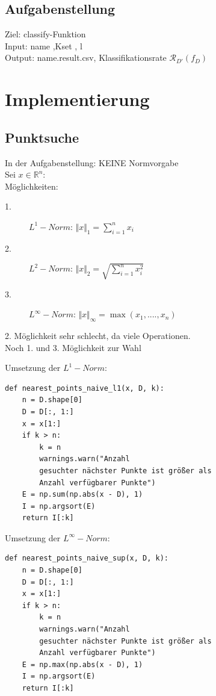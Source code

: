 \documentclass{beamer}
\begin{document}
\subsection{Aufgabenstellung}
\begin{frame}
Ziel: classify-Funktion\\
Input: name ,Kset , l \\
Output: name.result.csv, Klassifikationsrate $\mathcal{R}_{D'}(f_{D})$ \\
\vspace{20 mm}
\end{frame}



\section{Implementierung}
\subsection{Punktsuche}
\begin{frame}
In der Aufgabenstellung: KEINE Normvorgabe\\
Sei $ x \in \mathbb{R} ^n:$\\
Möglichkeiten:
\begin{description}
\item[1.] $L^1-Norm$: $\Vert x\Vert _{1}= \sum_{i=1}^n x_i $
\item[2.] $L^2-Norm$:  $\Vert x\Vert _{2}=\sqrt{ \sum_{i=1}^n x_i ^2} $
\item[3.] $L^{\infty}-Norm$:  $\Vert x\Vert _{\infty}= \max(x_1,....,x_n)$
\end{description}
2. Möglichkeit sehr schlecht, da viele Operationen.\\
Noch 1. und 3. Möglichkeit zur Wahl
\end{frame}


\begin{frame}[fragile]
Umsetzung der $L^1-Norm$:
\begin{verbatim}
def nearest_points_naive_l1(x, D, k):
    n = D.shape[0]
    D = D[:, 1:]
    x = x[1:]
    if k > n:
        k = n  
        warnings.warn("Anzahl
        gesuchter nächster Punkte ist größer als
        Anzahl verfügbarer Punkte")
    E = np.sum(np.abs(x - D), 1)
    I = np.argsort(E)
    return I[:k]
\end{verbatim}
\end{frame}


\begin{frame}[fragile]
Umsetzung der $L^{\infty}-Norm$:
\begin{verbatim}
def nearest_points_naive_sup(x, D, k):
    n = D.shape[0]
    D = D[:, 1:]
    x = x[1:]
    if k > n:
        k = n 
        warnings.warn("Anzahl
        gesuchter nächster Punkte ist größer als 
        Anzahl verfügbarer Punkte")
    E = np.max(np.abs(x - D), 1)
    I = np.argsort(E)
    return I[:k]
\end{verbatim}
\end{frame}
\end{document}
